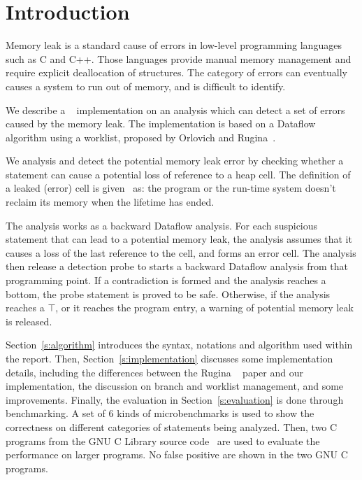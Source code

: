 \section{Introduction}
Memory leak is a standard cause of errors in low-level programming languages
such as C and C++. Those languages provide manual memory management and require
explicit deallocation of structures. The category of errors can eventually
causes a system to run out of memory, and is difficult to identify.

We describe a \llvm~\cite{llvm} implementation on an analysis which
can detect a set of errors caused by the memory leak. The implementation is
based on a Dataflow algorithm using a worklist, proposed by Orlovich and 
Rugina~\cite{rugina}.

We analysis and detect the potential memory leak error
by checking whether a statement can cause a potential loss of reference to a 
heap cell. The definition of a leaked (error) cell is given~\cite{rugina} as: the 
program or the run-time system doesn't reclaim its memory when the lifetime 
has ended.

The analysis works as a backward Dataflow analysis. For each suspicious 
statement that can lead to a potential memory leak, the analysis assumes that 
it causes a loss of the last reference to the cell, and forms an error cell. 
The analysis then release a detection probe to starts a backward 
Dataflow analysis from that programming point. If a contradiction is formed 
and the analysis reaches a bottom, the probe statement is proved to be safe. 
Otherwise, if the analysis reaches a $\top$, or it reaches the program entry, 
a warning of potential memory leak is released.

Section~\ref{s:algorithm} introduces the syntax, notations and algorithm
used within the report. Then, Section~\ref{s:implementation} discusses 
some implementation details, including the differences between the Rugina
~\cite{rugina} paper and our implementation, the discussion 
on branch and worklist management, and some improvements. 
Finally, the evaluation in Section~\ref{s:evaluation} is done through 
benchmarking. A set of 6 kinds
of microbenchmarks is used to show the correctness on different categories of
statements being analyzed. Then, two C programs from the GNU C Library source
code~\cite{glibc} are used to evaluate the performance on larger programs. No 
false positive are shown in the two GNU C programs.
